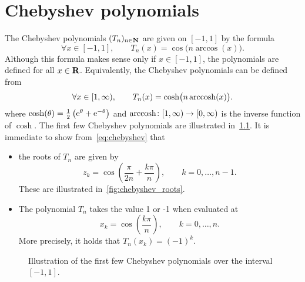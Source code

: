 \chapter{Chebyshev polynomials}%
\label{cha:Chebyshev polynomials}

The Chebyshev polynomials $(T_n)_{n \in \mathbf N}$ are given on $[-1, 1]$ by the formula
\begin{equation}
    \label{eq:chebyshev}
    \forall x \in [-1, 1], \qquad
    T_n(x) = \cos \bigl(n \arccos(x)\bigr).
\end{equation}
Although this formula makes sense only if $x \in [-1, 1]$,
the polynomials are defined for all $x \in \mathbf R$.
Equivalently,
the Chebyshev polynomials can be defined from
\begin{equation}
    \label{eq:chebyshev_cosh}
    \forall x \in [1, \infty), \qquad
    T_n(x) = \cosh \bigl(n \operatorname{arccosh}(x)\bigr).
\end{equation}
where $\cosh(\theta) = \frac{1}{2} \left( \mathrm e^\theta + \mathrm e^{-\theta} \right)$
and $\operatorname{arccosh}\colon [1, \infty) \to [0, \infty)$ is the inverse function of $\cosh$.
The first few Chebyshev polynomials are illustrated in~\cref{fig:chebyshev}.
It is immediate to show from~\eqref{eq:chebyshev} that
\begin{itemize}
    \item
        the roots of $T_n$ are given by
        \[
            z_k = \cos \left( \frac{\pi}{2n} + \frac{k\pi}{n} \right), \qquad k = 0, \dotsc, n-1.
        \]
        These are illustrated in~\cref{fig:chebyshev_roots}.

    \item
        The polynomial $T_n$ takes the value 1 or -1 when evaluated at
        \begin{equation}
            \label{eq:chebyshev_maxima}
            x_k = \cos \left( \frac{k \pi}{n} \right), \qquad k = 0, \dotsc, n.
        \end{equation}
        More precisely, it holds that $T_n(x_k) = (-1)^k$.
\end{itemize}


\begin{figure}
    \centering
    \caption{Illustration of the first few Chebyshev polynomials over the interval $[-1, 1]$.}
    \label{fig:chebyshev}
\end{figure}

